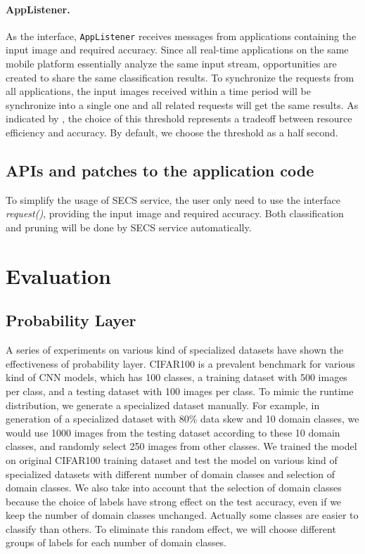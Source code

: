 \documentclass[pageno]{jpaper}
\begin{document}
\paragraph{AppListener.}
As the interface, \texttt{AppListener} receives messages from applications containing the input image and required accuracy. Since all real-time applications on the same mobile platform essentially analyze the same input stream, opportunities are created to share the same classification results. To synchronize the requests from all applications, the input images received within a time period will be synchronize into a single one and all related requests will get the same results. As indicated by \cite{jiang2018mainstream}, the choice of this threshold represents a tradeoff between resource efficiency and accuracy. By default, we choose the threshold as a half second.

\subsection{APIs and patches to the application code}
To simplify the usage of SECS service, the user only need to use the interface \textit{request()}, providing the input image and required accuracy. Both classification and pruning will be done by SECS service automatically.








\section{Evaluation} \label{evaluation}








\subsection{Probability Layer}
A series of experiments on various kind of specialized datasets have shown the effectiveness of probability layer. CIFAR100 is a prevalent benchmark for various kind of CNN models, which has 100 classes, a training dataset with 500 images per class, and a testing dataset with 100 images per class. To mimic the runtime distribution, we generate a specialized dataset manually. For example, in generation of a specialized dataset with 80\% data skew and 10 domain classes, we would use 1000 images from the testing dataset according to these 10 domain classes, and randomly select 250 images from other classes. We trained the model on original CIFAR100 training dataset and test the model on various kind of specialized datasets with different number of domain classes and selection of domain classes. We also take into account that the selection of domain classes because the choice of labels have strong effect on the test accuracy, even if we keep the number of domain classes unchanged. Actually some classes are easier to classify than others. To eliminate this random effect, we will choose different groups of labels for each number of domain classes.
\end{document}
